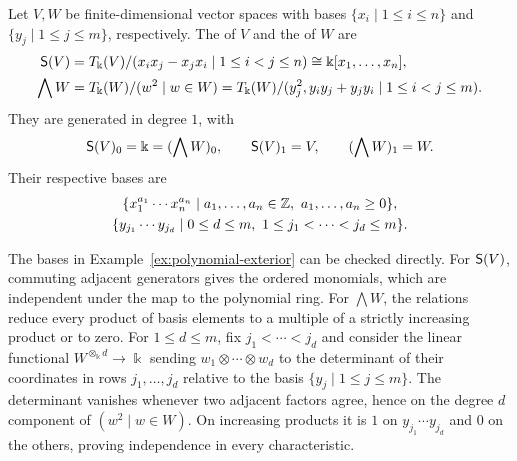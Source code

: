 \LectureEnd


\begin{example}\label{ex:polynomial-exterior}
Let $V,W$ be finite-dimensional vector spaces with bases $\{x_i\mid1\leq i\leq n\}$ and $\{y_j\mid1\leq j\leq m\}$, respectively.
The  of $V$ and the  of $W$ are
\begin{equation}\label{eq:polynomial-exterior}
\begin{aligned}
\mathsf{S}(V)&=T_\Bbbk(V)/(x_ix_j-x_jx_i\mid1\leq i<j\leq n)
            \cong\Bbbk[x_1,\ldots,x_n],\\
\bigwedge W&=T_\Bbbk(W)/(w^2\mid w\in W) = T_\Bbbk(W)/(y_j^2, y_iy_j+y_jy_i \mid 1\le i<j\le m).
\end{aligned}
\end{equation}
They are generated in degree $1$, with
\[
\mathsf{S}(V)_0=\Bbbk=(\bigwedge W)_0,\qquad
\mathsf{S}(V)_1=V,\qquad(\bigwedge W)_1=W.
\]
Their respective bases are
\[
\begin{gathered}
\{x_1^{a_1}\cdots x_n^{a_n}\mid a_1,\ldots,a_n\in\Z,\ a_1,\ldots,a_n\geq0\},\\
\{y_{j_1}\cdots y_{j_d}\mid0\leq d\leq m,\ 1\leq j_1<\cdots<j_d\leq m\}.
\end{gathered}
\]
\end{example}

\begin{supplementary}
The bases in Example~\ref{ex:polynomial-exterior} can be checked directly.
For $\mathsf{S}(V)$, commuting adjacent generators gives the ordered monomials, which are independent under the map to the polynomial ring.
For $\bigwedge W$, the relations reduce every product of basis elements to a multiple of a strictly increasing product or to zero.
For $1\leq d\leq m$, fix $j_1<\cdots<j_d$ and consider the linear functional $W^{\otimes_\Bbbk d}\to\Bbbk$ sending $w_1\otimes\cdots\otimes w_d$ to the determinant of their coordinates in rows $j_1,\ldots,j_d$ relative to the basis $\{y_j\mid1\leq j\leq m\}$.
The determinant vanishes whenever two adjacent factors agree, hence on the degree $d$ component of $(w^2\mid w\in W)$.
On increasing products it is $1$ on $y_{j_1}\cdots y_{j_d}$ and $0$ on the others, proving independence in every characteristic.
\end{supplementary}

